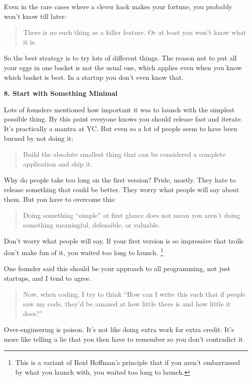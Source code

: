 \documentclass[12pt]{book}
\begin{document}
Even in the rare cases where a clever hack makes your fortune, you
probably won't know till later:

\begin{quote}
There is no such thing as a killer feature. Or at least you won't know
what it is.
\end{quote}

So the best strategy is to try lots of different things. The reason not
to put all your eggs in one basket is not the usual one, which applies
even when you know which basket is best. In a startup you don't even
know that.

\textbf{8. Start with Something Minimal}

Lots of founders mentioned how important it was to launch with the
simplest possible thing. By this point everyone knows you should release
fast and iterate. It's practically a mantra at YC. But even so a lot of
people seem to have been burned by not doing it:

\begin{quote}
Build the absolute smallest thing that can be considered a complete
application and ship it.
\end{quote}

Why do people take too long on the first version? Pride, mostly. They
hate to release something that could be better. They worry what people
will say about them. But you have to overcome this:

\begin{quote}
Doing something ``simple'' at first glance does not mean you aren't
doing something meaningful, defensible, or valuable.
\end{quote}

Don't worry what people will say. If your first version is so impressive
that trolls don't make fun of it, you waited too long to launch.
\footnote{This is a variant of Reid Hoffman's principle that if you aren't
embarrassed by what you launch with, you waited too long to launch.}

One founder said this should be your approach to all programming, not
just startups, and I tend to agree.

\begin{quote}
Now, when coding, I try to think ``How can I write this such that if
people saw my code, they'd be amazed at how little there is and how
little it does?''
\end{quote}

Over-engineering is poison. It's not like doing extra work for extra
credit. It's more like telling a lie that you then have to remember so
you don't contradict it.
\end{document}
